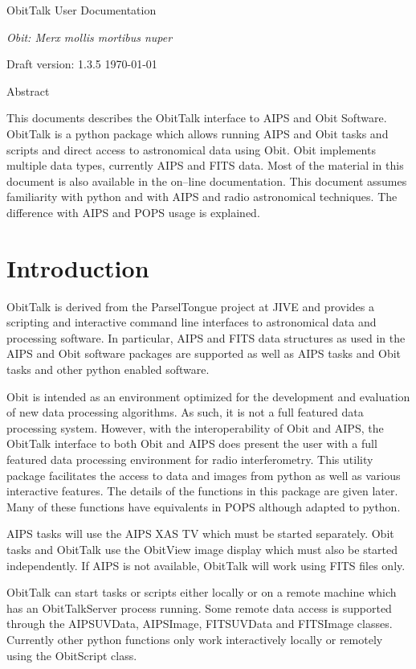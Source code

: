 \documentclass[11pt]{report}
\begin{document}
\setcounter{chapter}{1}

\topskip 1.5in
\centerline{\ttlfont ObitTalk User Documentation }
\vskip 1cm
\centerline{\LARGE\it Obit: Merx mollis mortibus nuper}
\vskip 3cm
\centerline{\secfont Draft version: 1.3.5 \today}
\vskip 1cm

\centerline{\secfont Abstract}
This documents describes the ObitTalk interface to AIPS and Obit
Software.
ObitTalk is a python package which allows running AIPS and Obit tasks
and scripts and direct access to astronomical data using Obit.
Obit implements multiple data types, currently AIPS and FITS data.
Most of the material in this document is also available in the on--line 
documentation.
This document assumes familiarity with python and with AIPS and radio
astronomical techniques.
The difference with AIPS and POPS usage is explained.
\clearpage
\topskip 0in
\newpage 
\tableofcontents
\newpage

\section {Introduction}
   ObitTalk is derived from the ParselTongue project at JIVE and
provides a scripting and interactive command line interfaces to
astronomical data and processing software.  In particular, AIPS and
FITS data structures as used in the AIPS and Obit software packages
are supported as well as AIPS tasks and Obit tasks and other python
enabled software.

Obit is intended as an environment optimized for the development and
evaluation of new data processing algorithms.
As such, it is not a full featured data processing system.
However, with the interoperability of Obit and AIPS, the ObitTalk
interface to both Obit and AIPS does present the user with a full
featured data processing environment for radio interferometry.
This utility  package facilitates the access to data and images from
python as well as various interactive features.  
The details of the functions in this package are given later.  
Many of these functions have equivalents in POPS although adapted to
python. 

   AIPS tasks will use the AIPS XAS TV which must be started separately.
Obit tasks and ObitTalk use the ObitView image display which must also
be started independently.  
If AIPS is not available, ObitTalk will work using FITS files only.

   ObitTalk can start tasks or scripts either locally or on a remote
machine  which has an ObitTalkServer process running.  
Some remote data access is supported through the AIPSUVData,
AIPSImage, FITSUVData and FITSImage classes.  
Currently other python functions only work interactively locally or
remotely using the ObitScript class.
\end{document}
